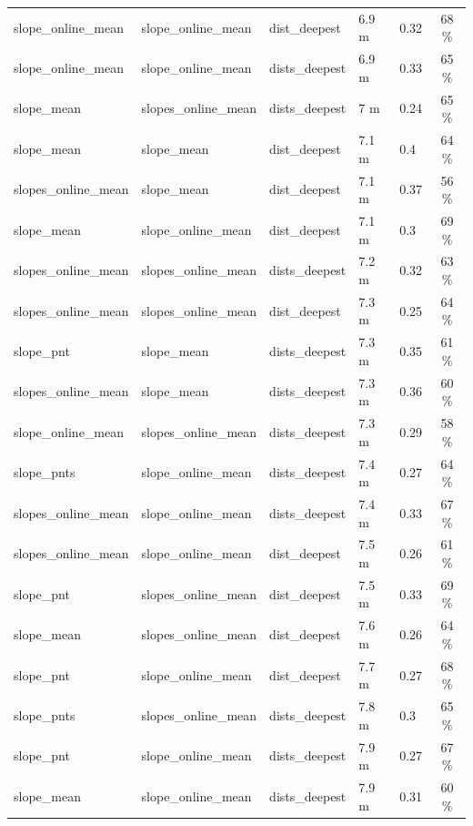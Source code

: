 \documentclass[draft,wrr]{agutexSI2019}
\begin{document}
\begin{table}
\begin{tabular}{lllllc}
slope\_online\_mean & slope\_online\_mean & dist\_deepest & 6.9 m & 0.32 & 68 \%\\
slope\_online\_mean & slope\_online\_mean & dists\_deepest & 6.9 m & 0.33 & 65 \%\\
slope\_mean & slopes\_online\_mean & dists\_deepest & 7 m & 0.24 & 65 \%\\
slope\_mean & slope\_mean & dist\_deepest & 7.1 m & 0.4 & 64 \%\\
slopes\_online\_mean & slope\_mean & dist\_deepest & 7.1 m & 0.37 & 56 \%\\
slope\_mean & slope\_online\_mean & dist\_deepest & 7.1 m & 0.3 & 69 \%\\
slopes\_online\_mean & slopes\_online\_mean & dists\_deepest & 7.2 m & 0.32 & 63 \%\\
slopes\_online\_mean & slopes\_online\_mean & dist\_deepest & 7.3 m & 0.25 & 64 \%\\
slope\_pnt & slope\_mean & dists\_deepest & 7.3 m & 0.35 & 61 \%\\
slopes\_online\_mean & slope\_mean & dists\_deepest & 7.3 m & 0.36 & 60 \%\\
slope\_online\_mean & slopes\_online\_mean & dists\_deepest & 7.3 m & 0.29 & 58 \%\\
slope\_pnts & slope\_online\_mean & dists\_deepest & 7.4 m & 0.27 & 64 \%\\
slopes\_online\_mean & slope\_online\_mean & dists\_deepest & 7.4 m & 0.33 & 67 \%\\
slopes\_online\_mean & slope\_online\_mean & dist\_deepest & 7.5 m & 0.26 & 61 \%\\
slope\_pnt & slopes\_online\_mean & dist\_deepest & 7.5 m & 0.33 & 69 \%\\
slope\_mean & slopes\_online\_mean & dist\_deepest & 7.6 m & 0.26 & 64 \%\\
slope\_pnt & slope\_online\_mean & dist\_deepest & 7.7 m & 0.27 & 68 \%\\
slope\_pnts & slopes\_online\_mean & dists\_deepest & 7.8 m & 0.3 & 65 \%\\
slope\_pnt & slope\_online\_mean & dists\_deepest & 7.9 m & 0.27 & 67 \%\\
slope\_mean & slope\_online\_mean & dists\_deepest & 7.9 m & 0.31 & 60 \%\\
\hline
\end{tabular}
\end{table}

\end{document}
